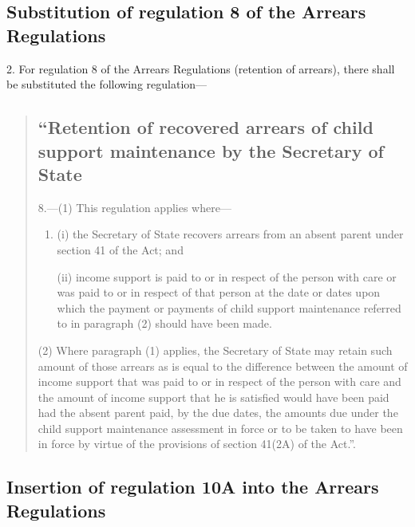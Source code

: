 \documentclass[a4paper]{article}
\begin{document}
\subsection[2. Substitution of regulation 8 of the Arrears Regulations]{Substitution of regulation 8 of the Arrears Regulations}

2.  For regulation 8 of the Arrears Regulations (retention of arrears), there shall be substituted the following regulation—
\begin{quotation}
\subsection*{“Retention of recovered arrears of child support maintenance by the Secretary of State}

8.—(1) This regulation applies where—
\begin{enumerate}\item[]
(i) the Secretary of State recovers arrears from an absent parent under section 41 of the Act; and

(ii) income support is paid to or in respect of the person with care or was paid to or in respect of that person at the date or dates upon which the payment or payments of child support maintenance referred to in paragraph (2) should have been made.
\end{enumerate}

(2) Where paragraph (1) applies, the Secretary of State may retain such amount of those arrears as is equal to the difference between the amount of income support that was paid to or in respect of the person with care and the amount of income support that he is satisfied would have been paid had the absent parent paid, by the due dates, the amounts due under the child support maintenance assessment in force or to be taken to have been in force by virtue of the provisions of section 41(2A) of the Act.”.
\end{quotation}

\subsection[3. Insertion of regulation 10A into the Arrears Regulations]{Insertion of regulation 10A into the Arrears Regulations}
\end{document}
